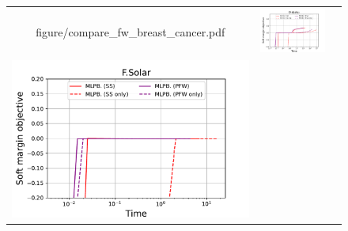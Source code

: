 \begin{figure}[p]
\begin{tabular}{ccc}
\begin{minipage}[t]{0.31\hsize}
            {figure/compare_fw_breast_cancer.pdf}
        \end{minipage}
        &
        \begin{minipage}[t]{0.31\hsize}
            \centering
            \includegraphics[keepaspectratio, scale=0.30]
            {figure/compare_fw_diabetis.pdf}
        \end{minipage}
        \\
        \begin{minipage}[t]{0.31\hsize}
            \centering
            \includegraphics[keepaspectratio, scale=0.30]
            {figure/compare_fw_flare_solar.pdf}
        \end{minipage}
        &
        \begin{minipage}[t]{0.31\hsize}
            \centering

\end{minipage}
\end{tabular}
\end{figure}
